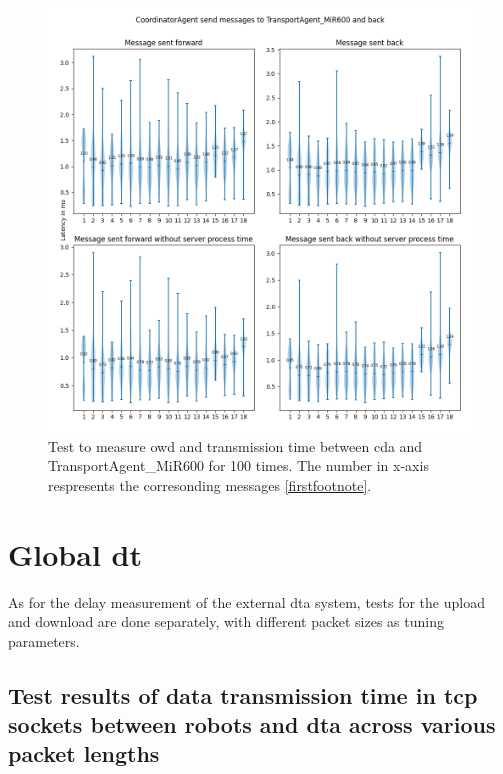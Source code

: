 \begin{figure}[htb]
    \centering
    \includegraphics[width=\textwidth]{figures/tests/usecase/violin_CoordinatorAgent_to_TransportAgent_MiR600.png}\hfill 
    \caption{Test to measure \gls{owd} and transmission time between \gls{cda} and 
    TransportAgent\_MiR600 for 100 times. The number in x-axis respresents the 
    corresonding messages \protect\ref{firstfootnote}.}
    \label{fig: violin-CDA-T600}
\end{figure}




\section{Global \gls{dt}}\label{chap: Result-External}
As for the delay measurement of the external \gls{dta} system, tests for the 
upload and download are done separately, with different packet sizes as tuning 
parameters. 


\subsection{Test results of data transmission 
time in \gls{tcp} sockets between robots and \gls{dta} across 
various packet lengths} \label{chap: Result-RCP-DTA}

